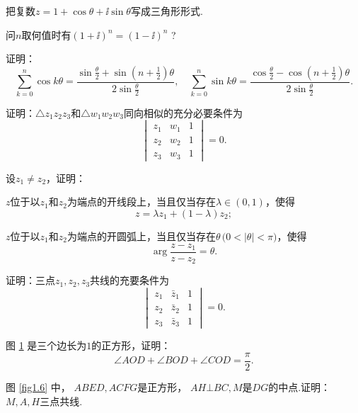 \begin{xiti}\hypertarget{xiti1.2}{}
 \item 把复数$z=1+\cos\theta+\ii\sin\theta$写成三角形形式.
 \item 问$n$取何值时有$(1+\ii)^n=(1-\ii)^n$ ?
 \item 证明：
  \[  \sum_{k=0}^n\cos k\theta=\frac{\sin\frac\theta2+\sin\left(n+\frac12\right)\theta}{2\sin\frac\theta2},\quad
  \sum_{k=0}^n\sin k\theta=\frac{\cos\frac\theta2-\cos\left(n+\frac12\right)\theta}{2\sin\frac\theta2}.\]
 \item 证明：$\triangle z_1z_2z_3$和$\triangle w_1w_2w_3$同向相似的充分必要条件为
  \[\begin{vmatrix}
   z_1&w_1&1\\z_2&w_2&1\\z_3&w_3&1
   \end{vmatrix}=0.\]
 \item 设$z_1\ne z_2$，证明：
  \begin{enuma}
   \item $z$位于以$z_1$和$z_2$为端点的开线段上，当且仅当存在$\lambda\in (0,1)$，使得
       \[z=\lambda z_1+(1-\lambda)z_2;\]
   \item $z$位于以$z_1$和$z_2$为端点的开圆弧上，当且仅当存在$\theta\,\big(0<|\theta|<\pi\big)$，使得
       \[\arg\frac{z-z_1}{z-z_2}=\theta.\]
  \end{enuma}
 \item 证明：三点$z_1,z_2,z_3$共线的充要条件为
   \[\begin{vmatrix}
       z_1&\bar z_1&1\\z_2&\bar z_2&1\\z_3&\bar z_3&1
   \end{vmatrix}=0.\]
 \item 图 \ref{fig1.5} 是三个边长为$1$的正方形，证明：
   \[\angle AOD+\angle BOD+\angle COD=\frac\pi2.\]
 \item 图 \ref{fig1.6} 中， $ABED,ACFG$是正方形， $AH\bot BC,M$是$DG$的中点.证明： $M,A,H$三点共线.
 \begin{figure}[!ht]
 \begin{minipage}[b]{0.48\textwidth}
   \centering
   \caption{}\label{fig1.5}
 \end{minipage}\hfill%

\end{figure}
\end{xiti}
